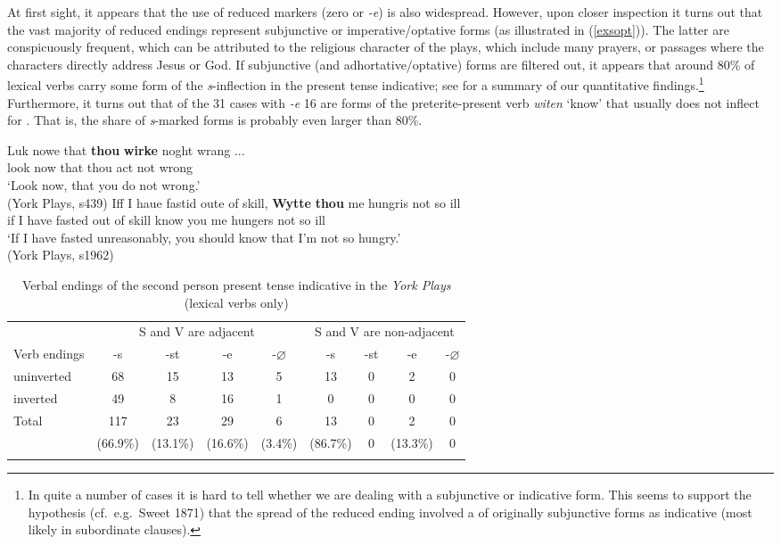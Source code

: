 \documentclass[output=paper]{langsci/langscibook}
\begin{document}
At first sight, it appears that the use of reduced markers (zero or \emph{-e})
is also widespread. However, upon closer inspection it turns out that the vast
majority of reduced endings represent subjunctive or imperative/optative forms
(as illustrated in (\ref{exsopt})). The latter are conspicuously frequent,
which can be attributed to the religious character of the plays, which include
many prayers, or passages where the characters directly address Jesus or God.
If subjunctive (and adhortative/optative) forms are filtered out, it appears
that around 80\% of \Ssg{} lexical verbs carry some form of the
\emph{s}-inflection in the present tense indicative; see
 for a summary of our quantitative
findings.\footnote{In quite a number of cases it is hard to tell whether we
    are dealing with a subjunctive or indicative form. This seems to support the
    hypothesis (cf.\ e.g.\ Sweet 1871) that the spread of the reduced ending involved
    a  of originally subjunctive forms as indicative (most likely in
subordinate clauses).} Furthermore, it turns out that of the 31 cases with
\emph{-e} 16 are forms of the preterite-present verb \emph{witen} `know' that
usually does not inflect for \Ssg{}. That is, the share of \emph{s}-marked
forms is probably even larger than 80\%.

\ea
\label{exsopt}
\ea \gll Luk nowe that \textbf{thou} \textbf{wirke} noght wrang ...\\
look now that thou act not wrong \\
\glt `Look now, that you do not wrong.'\\
(York Plays, s439)
\ex \gll Iff I haue fastid oute of skill, \textbf{Wytte} \textbf{thou} me hungris not so ill\\
if I have fasted out of skill know you me hungers not so ill\\
\glt `If I have fasted unreasonably, you should know that I'm not so hungry.'\\
(York Plays, s1962)
\z
\z

\begin{table}
        \begin{tabular}{lcccccccc}
            \lsptoprule
& \multicolumn{4}{c}{S and V are adjacent} & \multicolumn{4}{c}{S and V are non-adjacent}\\\cmidrule(lr){2-5}\cmidrule(lr){6-9}
Verb endings  & -s & -st & -e & -$\varnothing$ & -s & -st & -e & -$\varnothing$\\
uninverted & 68 & 15 & 13 & 5 & 13 & 0 & 2 & 0\\
inverted & 49 & 8 & 16 & 1  & 0 & 0 & 0 &  0\\\midrule
Total & 117  & 23  & 29  & 6  & 13  & 0 & 2  & 0\\
& (66.9\%) & (13.1\%) & (16.6\%) & (3.4\%) & (86.7\%) & 0 & (13.3\%) & 0\\
\lspbottomrule
\end{tabular}
\caption{Verbal endings of the second person present tense indicative in the
\emph{York Plays} (lexical verbs only)\label{table1-2ndps-lexical-verbs}}
\end{table}
\end{document}
